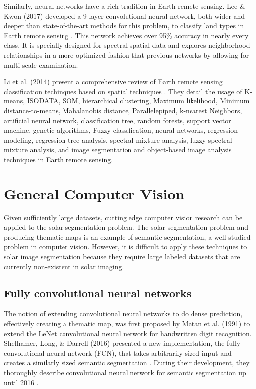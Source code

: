 \documentclass[twoside]{report}
\begin{document}
Similarly, neural networks have a rich tradition in Earth remote sensing. Lee \& Kwon (2017) developed a 9 layer convolutional neural network, both wider and deeper than state-of-the-art methods for this problem, to classify land types in Earth remote sensing \cite{lee2017going}. This network achieves over 95\% accuracy in nearly every class. It is specially designed for spectral-spatial data and explores neighborhood relationships in a more optimized fashion that previous networks by allowing for multi-scale examination.

Li et al. (2014) present a comprehensive review of Earth remote sensing classification techinques based on spatial techniques \cite{li2014review}. They detail the usage of K-means, ISODATA, SOM,
hierarchical clustering, Maximum likelihood, Minimum distance-to-means, Mahalanobis distance, Parallelepiped, k-nearest Neighbors,  artificial neural network, classification tree, random forests, support vector
machine, genetic algorithms, Fuzzy classification, neural networks, regression modeling, regression tree analysis, spectral mixture analysis, fuzzy-spectral mixture analysis,  and image segmentation and object-based image
analysis techniques in Earth remote sensing. 

\section{General Computer Vision}
Given sufficiently large datasets, cutting edge computer vision research can be applied to the solar segmentation problem. The solar segmentation problem and producing thematic maps is an example of semantic segmentation, a well studied problem in computer vision. However, it is difficult to apply these techniques to solar image segmentation because they require large labeled datasets that are currently non-existent in solar imaging. 

\subsection{Fully convolutional neural networks}
The notion of extending convolutional neural networks to do dense prediction, effectively creating a thematic map, was first proposed by Matan et al. (1991) \cite{matan} to extend the LeNet convolutional neural network \cite{lenet} for handwritten digit recognition. Shelhamer, Long, \& Darrell (2016) presented a new implementation, the fully convolutional neural network (FCN), that takes arbitrarily sized input and creates a similarly sized semantic segmentation \cite{fcnn}. During their development, they thoroughly describe convolutional neural network for semantic segmentation up until 2016 \cite{fcnn}.
\end{document}
